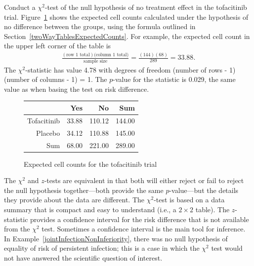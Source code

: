 \begin{examplewrap}
  \begin{nexample}{Conduct a $\chi^2$-test of the null hypothesis of no treatment effect in the tofacitinib trial.}\label{tofacitinibVsPlaceboChiSq}
Figure~\ref{tofacitinibVsPlaceboExpected} shows the expected cell counts calculated under the hypothesis of no difference between the groups, using the formula outlined in Section~\ref{twoWayTablesExpectedCounts}.  For example, the expected cell count in the upper left corner of the table is
\begin{align*}
  \frac{(\text{row 1 total})(\text{column 1 total)}}{\text{sample size}} =
  \frac{(144)(68)}{289} = 33.88.
\end{align*}
The $\chi^2$-statistic has value 4.78 with degrees of freedom (number of rows - 1)(number of columns - 1) = 1. The $p$-value for the statistic is 0.029, the same value as when basing the test on risk difference.
\end{nexample}
\end{examplewrap}
\begin{figure}[ht]
\centering
\begin{tabular}{rrrr}
  \hline
 & Yes & No & Sum \\ 
  \hline
Tofacitinib & 33.88 & 110.12 & 144.00 \\ 
  Placebo & 34.12 & 110.88 & 145.00 \\ 
  Sum & 68.00 & 221.00 & 289.00 \\ 
   \hline
\end{tabular}
\caption{Expected cell counts for the tofacitinib trial} 
\label{tofacitinibVsPlaceboExpected}
\end{figure}   

The $\chi^2$ and $z$-tests are equivalent in that both will either reject or fail to reject the null hypothesis together---both provide the same $p$-value---but the details they provide about the data are different.  The $\chi^2$-test is based on a data summary that is compact and easy to understand (i.e., a $2 \times 2$ table).  The $z$-statistic provides a confidence interval for the risk difference that is not available from the $\chi^2$ test.  Sometimes a confidence interval is the main tool for inference.  In Example~\ref{jointInfectionNonInferiority}, there was no null hypothesis of equality of risk of persistent infection; this is a case in which the $\chi^2$ test would not have answered the scientific question of interest.


